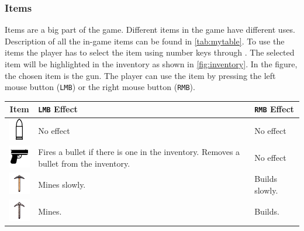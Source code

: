 \subsubsection{Items}
Items are a big part of the game.
Different items in the game have different uses.
Description of all the in-game items can be found in \autoref{tab:mytable}.
To use the items the player has to select the item using number keys  through .
The selected item will be highlighted in the inventory as shown in \autoref{fig:inventory}.
In the figure, the chosen item is the gun.
The player can use the item by pressing the left mouse button (\texttt{LMB}) or the right mouse button (\texttt{RMB}).

\begin{table}[h]
    \centering
    \begin{tabular}{|c|p{5cm}|p{5cm}|}
        \hline
        Item                                                                         & \texttt{LMB} Effect                                                                   & \texttt{RMB} Effect \\
        \hline
        \includegraphics[width=1cm]{chapters/user_manual/resources/bullet.png}       & No effect                                                                             & No effect           \\
        \hline
        \includegraphics[width=1cm]{chapters/user_manual/resources/pistol.png}       & Fires a bullet if there is one in the inventory. Removes a bullet from the inventory. & No effect           \\
        \hline
        \includegraphics[width=1cm]{chapters/user_manual/resources/pickaxe-slow.png} & Mines slowly.                                                                         & Builds slowly.      \\
        \hline
        \includegraphics[width=1cm]{chapters/user_manual/resources/pickaxe-mid.png}  & Mines.                                                                                & Builds.             \\

\end{tabular}
\end{table}
